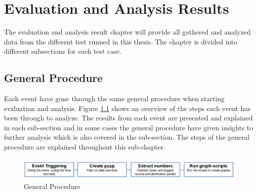 \chapter{Evaluation and Analysis Results}
The evaluation and analysis result chapter will provide all gathered and analyzed data from the different test runned in this thesis. The chapter is divided into different subsections for each test case. 
\section{General Procedure}
Each event have gone through the same general procedure when starting evaluation and analysis. Figure \ref{fig:GeneralProcedure} shows an overview of the steps each event has been through to analyze. The results from each event are presented and explained in each sub-section and in some cases the general procedure have given insights to further analysis which is also covered in the sub-section. The steps of the general procedure are explained throughout this sub-chapter.

\begin{figure}[H]
    \centering
    \includegraphics[width=\textwidth]{figures/GeneralProcedure.png}
    \caption{General Procedure}
    \label{fig:GeneralProcedure}
\end{figure}

